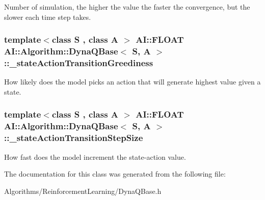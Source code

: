 Number of simulation, the higher the value the faster the convergence, but the slower each time step takes. \hypertarget{classAI_1_1Algorithm_1_1DynaQBase_ae3f83dbeea191fc8bdcd518a2e54af97}{
\subsubsection[{\-\_\-state\-Action\-Transition\-Greediness}]{\setlength{\rightskip}{0pt plus 5cm}template$<$class S , class A $>$ {\bf A\-I\-::\-F\-L\-O\-A\-T} {\bf A\-I\-::\-Algorithm\-::\-Dyna\-Q\-Base}$<$ S, A $>$\-::\-\_\-state\-Action\-Transition\-Greediness\hspace{0.3cm}{\ttfamily [protected]}}}\label{classAI_1_1Algorithm_1_1DynaQBase_ae3f83dbeea191fc8bdcd518a2e54af97}
How likely does the model picks an action that will generate highest value given a state. \hypertarget{classAI_1_1Algorithm_1_1DynaQBase_a1fd132ae0aeb356a891e5b81bf218338}{
\subsubsection[{\-\_\-state\-Action\-Transition\-Step\-Size}]{\setlength{\rightskip}{0pt plus 5cm}template$<$class S , class A $>$ {\bf A\-I\-::\-F\-L\-O\-A\-T} {\bf A\-I\-::\-Algorithm\-::\-Dyna\-Q\-Base}$<$ S, A $>$\-::\-\_\-state\-Action\-Transition\-Step\-Size\hspace{0.3cm}{\ttfamily [protected]}}}\label{classAI_1_1Algorithm_1_1DynaQBase_a1fd132ae0aeb356a891e5b81bf218338}
How fast does the model increment the state-\/action value. 

The documentation for this class was generated from the following file\-:\begin{DoxyCompactItemize}
\item 
Algorithms/\-Reinforcement\-Learning/Dyna\-Q\-Base.\-h\end{DoxyCompactItemize}
